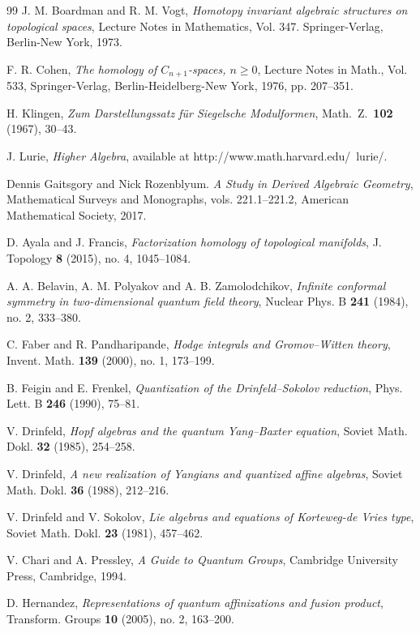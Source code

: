 \begin{thebibliography}{99}
 J. M. Boardman and R. M. Vogt, \emph{Homotopy invariant algebraic structures on topological spaces}, Lecture Notes in Mathematics, Vol. 347. Springer-Verlag, Berlin-New York, 1973.

 F. R. Cohen, \emph{The homology of $C_{n+1}$-spaces, $n \geq 0$}, Lecture Notes in Math., Vol. 533, Springer-Verlag, Berlin-Heidelberg-New York, 1976, pp. 207--351.

 H. Klingen, \emph{Zum Darstellungssatz f\"ur Siegelsche Modulformen}, Math.\ Z.\ \textbf{102} (1967), 30--43.

 J. Lurie, \emph{Higher Algebra}, available at http://www.math.harvard.edu/~lurie/.

Dennis Gaitsgory and Nick Rozenblyum.
\textit{A Study in Derived Algebraic Geometry}, Mathematical Surveys and Monographs, vols. 221.1--221.2, American Mathematical Society, 2017.

 D. Ayala and J. Francis, \emph{Factorization homology of topological manifolds}, J. Topology \textbf{8} (2015), no. 4, 1045--1084.

 A. A. Belavin, A. M. Polyakov and A. B. Zamolodchikov, \emph{Infinite conformal symmetry in two-dimensional quantum field theory}, Nuclear Phys. B \textbf{241} (1984), no. 2, 333--380.

 C. Faber and R. Pandharipande, \emph{Hodge integrals and Gromov--Witten theory}, Invent. Math. \textbf{139} (2000), no. 1, 173--199.

 B. Feigin and E. Frenkel, \emph{Quantization of the Drinfeld--Sokolov reduction}, Phys. Lett. B \textbf{246} (1990), 75--81.

 V. Drinfeld, \emph{Hopf algebras and the quantum Yang--Baxter equation}, Soviet Math. Dokl. \textbf{32} (1985), 254--258.

 V. Drinfeld, \emph{A new realization of Yangians and quantized affine algebras}, Soviet Math. Dokl. \textbf{36} (1988), 212--216.

 V. Drinfeld and V. Sokolov, \emph{Lie algebras and equations of Korteweg-de Vries type}, Soviet Math. Dokl. \textbf{23} (1981), 457--462.

 V. Chari and A. Pressley, \emph{A Guide to Quantum Groups}, Cambridge University Press, Cambridge, 1994.

 D. Hernandez, \emph{Representations of quantum affinizations and fusion product}, Transform. Groups \textbf{10} (2005), no. 2, 163--200.


\end{thebibliography}
